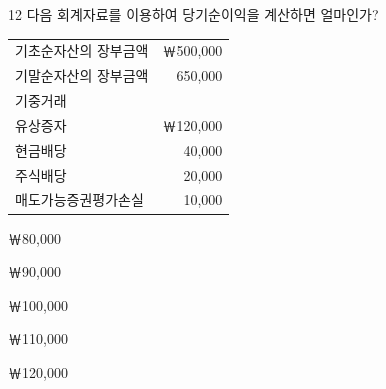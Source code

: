\begin{question}{12}
다음 회계자료를 이용하여 당기순이익을 계산하면 얼마인가?

{\small\centering
\begin{tabular}{@{}l r@{}}
\hline
기초순자산의 장부금액 & ￦500,000 \\
기말순자산의 장부금액 & 650,000 \\
\hline
기중거래 & \\
\hspace{1em}유상증자 & ￦120,000 \\
\hspace{1em}현금배당 & 40,000 \\
\hspace{1em}주식배당 & 20,000 \\
\hspace{1em}매도가능증권평가손실 & 10,000 \\
\hline
\end{tabular}\par}
\begin{choices}
  \item ￦80,000
  \item ￦90,000
  \item ￦100,000
  \item ￦110,000
  \item ￦120,000
\end{choices}
\end{question}

